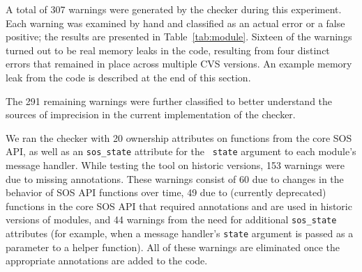A total of 307 warnings were generated by the checker during this experiment.
Each warning was examined by hand and classified as an
actual error or a false positive; the results are presented in
Table~\ref{tab:module}.  Sixteen of the warnings turned out
to be real memory leaks in the code, resulting from four distinct
errors 
that remained in place across multiple CVS versions.  An example
memory leak from the code is described at the end of this section.

The 291 remaining warnings were further classified to better understand the
sources of imprecision in 
the current implementation of the checker.  
%

\smallskip
{}
We ran the checker with 20 ownership attributes on functions from the
core SOS API, as well as an {\tt sos\_state} attribute for the {\tt
  state} argument to each module's message handler.
While testing the tool on historic versions, 153 warnings were due to missing
annotations.
These warnings consist of 60 due to changes in the behavior of
SOS API functions
over time, 49 due to
(currently deprecated) functions in the core SOS API that required
annotations and are used in historic versions of 
modules,
and 44 warnings from the need for additional {\tt sos\_state}
attributes (for example, when a message handler's {\tt state} argument
is passed as a parameter to a helper function).
All of
these warnings are eliminated once the appropriate annotations
are added to the code.

